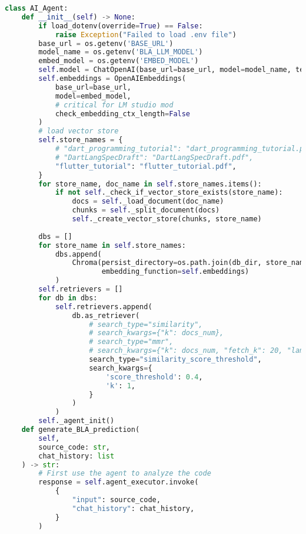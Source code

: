 \begin{lstlisting}[language=Python, caption={$\texttt{AI\_Agent}$ class.}, label={lst:12}]
class AI_Agent:
    def __init__(self) -> None:
        if load_dotenv(override=True) == False:
            raise Exception("Failed to load .env file")
        base_url = os.getenv('BASE_URL')
        model_name = os.getenv('BLA_LLM_MODEL')
        embed_model = os.getenv('EMBED_MODEL')
        self.model = ChatOpenAI(base_url=base_url, model=model_name, temperature=0)
        self.embeddings = OpenAIEmbeddings(
            base_url=base_url, 
            model=embed_model,
            # critical for LM studio mod
            check_embedding_ctx_length=False
        )
        # load vector store
        self.store_names = {
            # "dart_programming_tutorial": "dart_programming_tutorial.pdf",
            # "DartLangSpecDraft": "DartLangSpecDraft.pdf",
            "flutter_tutorial": "flutter_tutorial.pdf",
        } 
        for store_name, doc_name in self.store_names.items():
            if not self._check_if_vector_store_exists(store_name):
                docs = self._load_document(doc_name)
                chunks = self._split_document(docs)
                self._create_vector_store(chunks, store_name)
                
        dbs = []
        for store_name in self.store_names:
            dbs.append(
                Chroma(persist_directory=os.path.join(db_dir, store_name),
                       embedding_function=self.embeddings)
            )
        self.retrievers = []
        for db in dbs:
            self.retrievers.append(
                db.as_retriever(
                    # search_type="similarity",
                    # search_kwargs={"k": docs_num},
                    # search_type="mmr",
                    # search_kwargs={"k": docs_num, "fetch_k": 20, "lambda_mult": 0.5}
                    search_type="similarity_score_threshold",
                    search_kwargs={
                        'score_threshold': 0.4,
                        'k': 1,
                    }
                )
            )
        self._agent_init()
    def generate_BLA_prediction(
        self, 
        source_code: str, 
        chat_history: list
    ) -> str:
        # First use the agent to analyze the code
        response = self.agent_executor.invoke(
            {
                "input": source_code,
                "chat_history": chat_history,
            }
        )
        

\end{lstlisting}
